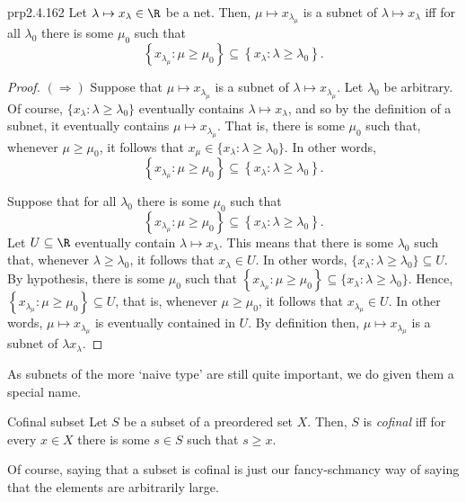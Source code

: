 \begin{prp}{}{prp2.4.162}
Let $\lambda \mapsto x_{\lambda}\in \R$ be a net.  Then, $\mu \mapsto x_{\lambda _{\mu}}$ is a subnet of $\lambda \mapsto x_{\lambda}$ iff for all $\lambda _0$ there is some $\mu _0$ such that
\begin{equation}
\left\{ x_{\lambda _{\mu}}:\mu \geq \mu _0\right\} \subseteq \left\{ x_{\lambda}:\lambda \geq \lambda _0\right\} .
\end{equation}
\begin{proof}
$(\Rightarrow )$ Suppose that $\mu \mapsto x_{\lambda _{\mu}}$ is a subnet of $\lambda \mapsto x_{\lambda _{\mu}}$.  Let $\lambda _0$ be arbitrary.  Of course, $\{ x_{\lambda}:\lambda \geq \lambda _0\}$ eventually contains $\lambda \mapsto x_{\lambda}$, and so by the definition of a subnet, it eventually contains $\mu \mapsto x_{\lambda _{\mu}}$.  That is, there is some $\mu _0$ such that, whenever $\mu \geq \mu _0$, it follows that $x_{\mu}\in \{ x_{\lambda}:\lambda \geq \lambda _0\}$.  In other words,
\begin{equation}
\left\{ x_{\lambda _{\mu}}:\mu \geq \mu _0\right\} \subseteq \left\{ x_{\lambda}:\lambda \geq \lambda _0\right\} .
\end{equation}

\blankline
\noindent
Suppose that for all $\lambda _0$ there is some $\mu _0$ such that
\begin{equation}
\left\{ x_{\lambda _{\mu}}:\mu \geq \mu _0\right\} \subseteq \left\{ x_{\lambda}:\lambda \geq \lambda _0\right\} .
\end{equation}
Let $U\subseteq \R$ eventually contain $\lambda \mapsto x_{\lambda}$.  This means that there is some $\lambda _0$ such that, whenever $\lambda \geq \lambda _0$, it follows that $x_{\lambda}\in U$.  In other words, $\{ x_{\lambda}:\lambda \geq \lambda _0\} \subseteq U$.  By hypothesis, there is some $\mu _0$ such that $\left\{ x_{\lambda _{\mu}}:\mu \geq \mu _0\right\} \subseteq \{ x_{\lambda}:\lambda \geq \lambda _0\}$.  Hence, $\left\{ x_{\lambda _{\mu}}:\mu \geq \mu _0\right\} \subseteq U$, that is, whenever $\mu \geq \mu _0$, it follows that $x_{\lambda _{\mu}}\in U$.  In other words, $\mu \mapsto x_{\lambda _{\mu}}$ is eventually contained in $U$.  By definition then, $\mu \mapsto x_{\lambda _{\mu}}$ is a subnet of $\lambda x_{\lambda}$.
\end{proof}
\end{prp}
As subnets of the more `naive type' are still quite important, we do given them a special name.
\begin{dfn}{Cofinal subset}{}
Let $S$ be a subset of a preordered set $X$.  Then, $S$ is \emph{cofinal} iff for every $x\in X$ there is some $s\in S$ such that $s\geq x$.
\begin{rmk}
Of course, saying that a subset is cofinal is just our fancy-schmancy way of saying that the elements are arbitrarily large.
\end{rmk}
\end{dfn}
